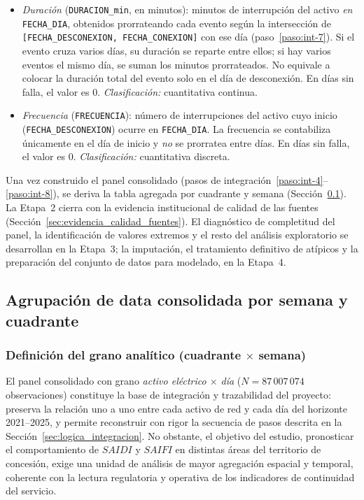     \begin{itemize}
        \item \textit{Duración} (\texttt{DURACION\_min}, en minutos): minutos de interrupción del activo \textit{en} \texttt{FECHA\_DIA}, obtenidos prorrateando cada evento según la intersección de \texttt{[FECHA\_DESCONEXION, FECHA\_CONEXION]} con ese día (paso~\ref{paso:int-7}). Si el evento cruza varios días, su duración se reparte entre ellos; si hay varios eventos el mismo día, se suman los minutos prorrateados. No equivale a colocar la duración total del evento solo en el día de desconexión. En días sin falla, el valor es $0$. \textit{Clasificación:} cuantitativa continua.
    
        \item \textit{Frecuencia} (\texttt{FRECUENCIA}): número de interrupciones del activo cuyo inicio (\texttt{FECHA\_DESCONEXION}) ocurre en \texttt{FECHA\_DIA}. La frecuencia se contabiliza únicamente en el día de inicio y \textit{no} se prorratea entre días. En días sin falla, el valor es $0$. \textit{Clasificación:} cuantitativa discreta.
    \end{itemize}
    
    
    
    Una vez construido el panel consolidado (pasos de integración~\ref{paso:int-4}--\ref{paso:int-8}), se deriva la tabla agregada por cuadrante y semana (Sección~\ref{sec:agrupacion_cuadrante_semana}). La Etapa~2 cierra con la evidencia institucional de calidad de las fuentes (Sección~\ref{sec:evidencia_calidad_fuentes}). El diagnóstico de completitud del panel, la identificación de valores extremos y el resto del análisis exploratorio se desarrollan en la Etapa~3; la imputación, el tratamiento definitivo de atípicos y la preparación del conjunto de datos para modelado, en la Etapa~4.
    
    \subsection{Agrupación de data consolidada por semana y cuadrante}
    \label{sec:agrupacion_cuadrante_semana}
    
    \subsubsection{Definición del grano analítico (cuadrante $\times$ semana)}
    
    El panel consolidado con grano \textit{activo eléctrico $\times$ día} ($N = 87\,007\,074$ observaciones) constituye la base de integración y trazabilidad del proyecto: preserva la relación uno a uno entre cada activo de red y cada día del horizonte 2021--2025, y permite reconstruir con rigor la secuencia de pasos descrita en la Sección~\ref{sec:logica_integracion}. No obstante, el objetivo del estudio, pronosticar el comportamiento de $SAIDI$ y $SAIFI$ en distintas áreas del territorio de concesión, exige una unidad de análisis de mayor agregación espacial y temporal, coherente con la lectura regulatoria y operativa de los indicadores de continuidad del servicio.
    
